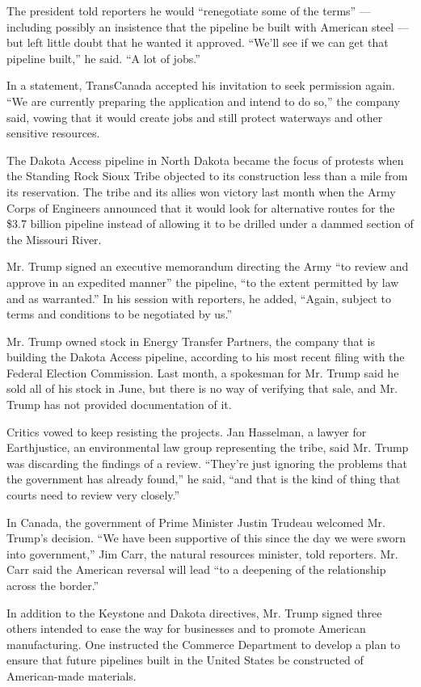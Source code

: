 The president told reporters he would ``renegotiate some of the terms''
--- including possibly an insistence that the pipeline be built with
American steel --- but left little doubt that he wanted it approved.
``We'll see if we can get that pipeline built,'' he said. ``A lot of
jobs.''

In a statement, TransCanada accepted his invitation to seek permission
again. ``We are currently preparing the application and intend to do
so,'' the company said, vowing that it would create jobs and still
protect waterways and other sensitive resources.

The Dakota Access pipeline in North Dakota became the focus of protests
when the Standing Rock Sioux Tribe objected to its construction less
than a mile from its reservation. The tribe and its allies won victory
last month when the Army Corps of Engineers announced that it would look
for alternative routes for the \$3.7 billion pipeline instead of
allowing it to be drilled under a dammed section of the Missouri River.

Mr. Trump signed an executive memorandum directing the Army ``to review
and approve in an expedited manner'' the pipeline, ``to the extent
permitted by law and as warranted.'' In his session with reporters, he
added, ``Again, subject to terms and conditions to be negotiated by
us.''

Mr. Trump owned stock in Energy Transfer Partners, the company that is
building the Dakota Access pipeline, according to his most recent filing
with the Federal Election Commission. Last month, a spokesman for Mr.
Trump said he sold all of his stock in June, but there is no way of
verifying that sale, and Mr. Trump has not provided documentation of it.

Critics vowed to keep resisting the projects. Jan Hasselman, a lawyer
for Earthjustice, an environmental law group representing the tribe,
said Mr. Trump was discarding the findings of a review. ``They're just
ignoring the problems that the government has already found,'' he said,
``and that is the kind of thing that courts need to review very
closely.''

In Canada, the government of Prime Minister Justin Trudeau welcomed Mr.
Trump's decision. ``We have been supportive of this since the day we
were sworn into government,'' Jim Carr, the natural resources minister,
told reporters. Mr. Carr said the American reversal will lead ``to a
deepening of the relationship across the border.''

In addition to the Keystone and Dakota directives, Mr. Trump signed
three others intended to ease the way for businesses and to promote
American manufacturing. One instructed the Commerce Department to
develop a plan to ensure that future pipelines built in the United
States be constructed of American-made materials.

